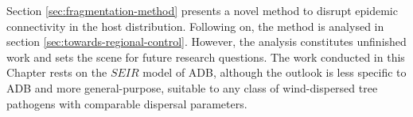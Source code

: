 Section \ref{sec:fragmentation-method} presents a novel method to disrupt epidemic connectivity in the host distribution.
Following on, the method is analysed in section \ref{sec:towards-regional-control}. However, the analysis constitutes unfinished work and sets the scene for future research questions.
The work conducted in this Chapter rests on the $SEIR$ model of ADB, although the outlook is less specific to ADB and more general-purpose, suitable to any class of wind-dispersed tree pathogens with comparable dispersal parameters. 





